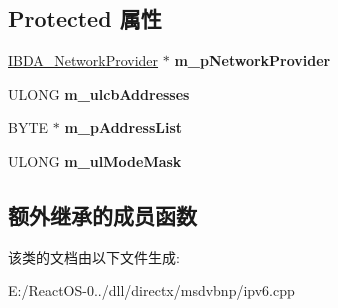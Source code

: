 \subsection*{Protected 属性}
\begin{DoxyCompactItemize}
\item 
\mbox{\label{class_c_i_p_v6_filter_a5c99bb3aa35a725079cb3d89af1570eb}} 
\hyperlink{interface_i_b_d_a___network_provider}{I\+B\+D\+A\+\_\+\+Network\+Provider} $\ast$ {\bfseries m\+\_\+p\+Network\+Provider}
\item 
\mbox{\label{class_c_i_p_v6_filter_a6c6cb294a80f7e3f6e05be2ff528297b}} 
U\+L\+O\+NG {\bfseries m\+\_\+ulcb\+Addresses}
\item 
\mbox{\label{class_c_i_p_v6_filter_a44412a2d9bb8c77ff70206fe08e27b41}} 
B\+Y\+TE $\ast$ {\bfseries m\+\_\+p\+Address\+List}
\item 
\mbox{\label{class_c_i_p_v6_filter_a2df75f5130b8bf477e36a7ba45b6bf49}} 
U\+L\+O\+NG {\bfseries m\+\_\+ul\+Mode\+Mask}
\end{DoxyCompactItemize}
\subsection*{额外继承的成员函数}


该类的文档由以下文件生成\+:\begin{DoxyCompactItemize}
\item 
E\+:/\+React\+O\+S-\/0../dll/directx/msdvbnp/ipv6.\+cpp\end{DoxyCompactItemize}
